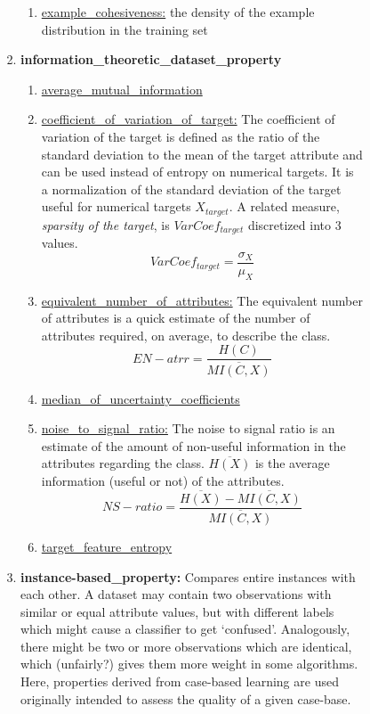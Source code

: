 \documentclass[a4paper,12pt, english]{article}
\begin{document}
\begin{enumerate}
\begin{enumerate}
\begin{enumerate}
\begin{enumerate}
\begin{enumerate}
\begin{enumerate}
				\item \underline{example\_cohesiveness:}  the density of the example distribution in the training set
				\end{enumerate}			
			\item \textbf{information\_theoretic\_dataset\_property}
				\begin{enumerate}
				\item \underline{average\_mutual\_information}
				\item \underline{coefficient\_of\_variation\_of\_target:} The coefficient of variation of the target is defined as the ratio of the standard deviation to the mean of the target attribute and can be used instead of entropy on numerical targets. It is a normalization of the standard deviation of the target useful for numerical targets $X_{target}$. A related measure, \emph{sparsity of the target}, is $VarCoef_{target}$ discretized into 3 values. \begin{equation} VarCoef_{target}=\frac{\sigma_{X}}{\mu_{X}} \end{equation}
				\item \underline{equivalent\_number\_of\_attributes:} The equivalent number of attributes is a quick estimate of the number of attributes required, on average, to describe the class. \begin{equation} EN-atrr=\frac{H(C)}{\overline{MI(C,X)}} \end{equation}
				\item \underline{median\_of\_uncertainty\_coefficients}
				\item \underline{noise\_to\_signal\_ratio:} The noise to signal ratio is an estimate of the amount of non-useful information in the attributes regarding the class. $\overline{H(X)}$ is the average information (useful or not) of the attributes. \begin{equation} NS-ratio=\frac{\overline{H(X)}-\overline{MI(C,X)}}{\overline{MI(C,X)}} \end{equation}
				\item \underline{target\_feature\_entropy}
				\end{enumerate}			
			\item \textbf{instance-based\_property:} Compares entire instances with each other. A dataset may contain two observations with similar or equal attribute values, but with different labels which might cause a classifier to get ‘confused’. Analogously, there might be two or more observations which are identical, which (unfairly?) gives them more weight in some algorithms. Here, properties derived from case-based learning are used originally intended to assess the quality of a given case-base.

\end{enumerate}
\end{enumerate}
\end{enumerate}
\end{enumerate}
\end{enumerate}
\end{document}
